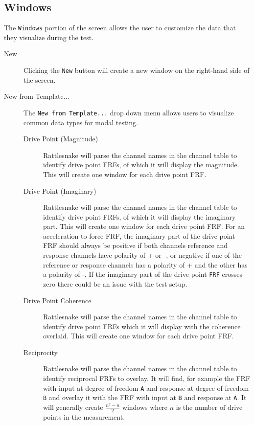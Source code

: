 \documentclass[pdf,12pt,report]{SANDreport}
\newcommand{\inlineCode}{\lstinline[basicstyle=\bfseries\ttfamily]}
\begin{document}
    \subsection{Windows}
    The \inlineCode{Windows} portion of the screen allows the user to customize the data that they visualize during the test.
    
    \begin{description}
        \item[New] Clicking the \inlineCode{New} button will create a new window on the right-hand side of the screen.
        \item[New from Template...] The \inlineCode{New from Template...} drop down menu allows users to visualize common data types for modal testing.
        \begin{description}
            \item[Drive Point (Magnitude)] Rattlesnake will parse the channel names in the channel table to identify drive point \Ac{FRF}s, of which it will display the magnitude.  This will create one window for each drive point \Ac{FRF}.
            \item[Drive Point (Imaginary)] Rattlesnake will parse the channel names in the channel table to identify drive point \Ac{FRF}s, of which it will display the imaginary part.  This will create one window for each drive point \Ac{FRF}.  For an acceleration to force \ac{FRF}, the imaginary part of the drive point \ac{FRF} should always be positive if both channels reference and response channels have polarity of + or -, or negative if one of the reference or response channels has a polarity of + and the other has a polarity of -.  If the imaginary part of the drive point \inlineCode{FRF} crosses zero there could be an issue with the test setup.
            \item[Drive Point Coherence] Rattlesnake will parse the channel names in the channel table to identify drive point \Ac{FRF}s which it will display with the coherence overlaid.  This will create one window for each drive point \Ac{FRF}.
            \item[Reciprocity] Rattlesnake will parse the channel names in the channel table to identify reciprocal \ac{FRF}s to overlay.  It will find, for example the \ac{FRF} with input at degree of freedom \inlineCode{A} and response at degree of freedom \inlineCode{B} and overlay it with the \ac{FRF} with input at \inlineCode{B} and response at \inlineCode{A}.  It will generally create $\frac{n^2-n}{2}$ windows where $n$ is the number of drive points in the measurement.

\end{description}
\end{description}
\end{document}
